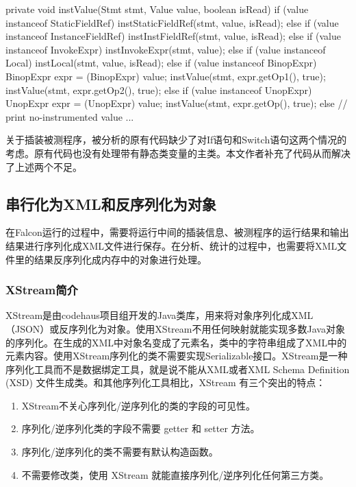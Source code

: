 \begin{code}[language={[AspectJ]Java}, label=lst:instValue, caption=instValue()方法片段]
  private void instValue(Stmt stmt, Value value, boolean isRead){
    if (value instanceof StaticFieldRef) {
        instStaticFieldRef(stmt, value, isRead);
    } else if (value instanceof InstanceFieldRef) {
        instInstFieldRef(stmt, value, isRead);
    } else if (value instanceof InvokeExpr) {
        instInvokeExpr(stmt, value);
    } else if (value instanceof Local) {
        instLocal(stmt, value, isRead);
    } else if (value instanceof BinopExpr) {
        BinopExpr expr = (BinopExpr) value;
        instValue(stmt, expr.getOp1(), true);
        instValue(stmt, expr.getOp2(), true);
    } else if (value instanceof UnopExpr) {
        UnopExpr expr = (UnopExpr) value;
        instValue(stmt, expr.getOp(), true);
    } else {
        // print no-instrumented value
        ...
    }
  }
\end{code}\par
关于插装被测程序，被分析的原有代码缺少了对If语句和Switch语句这两个情况的考虑。原有代码也没有处理带有静态类变量的主类。本文作者补充了代码从而解决了上述两个不足。
\subsection{串行化为XML和反序列化为对象}
在Falcon运行的过程中，需要将运行中间的插装信息、被测程序的运行结果和输出结果进行序列化成XML文件进行保存。在分析、统计的过程中，也需要将XML文件里的结果反序列化成内存中的对象进行处理。
\subsubsection{XStream简介}
XStream是由codehaus项目组开发的Java类库，用来将对象序列化成XML（JSON）或反序列化为对象\cite{xstream}。使用XStream不用任何映射就能实现多数Java对象的序列化。在生成的XML中对象名变成了元素名，类中的字符串组成了XML中的元素内容。使用XStream序列化的类不需要实现Serializable接口。XStream是一种序列化工具而不是数据绑定工具，就是说不能从XML或者XML Schema Definition (XSD) 文件生成类。和其他序列化工具相比，XStream 有三个突出的特点：
\begin{enumerate}
  \item XStream不关心序列化/逆序列化的类的字段的可见性。
  \item 序列化/逆序列化类的字段不需要 getter 和 setter 方法。
  \item 序列化/逆序列化的类不需要有默认构造函数。
  \item 不需要修改类，使用 XStream 就能直接序列化/逆序列化任何第三方类\cite{xstream_ibm}。
\end{enumerate}
